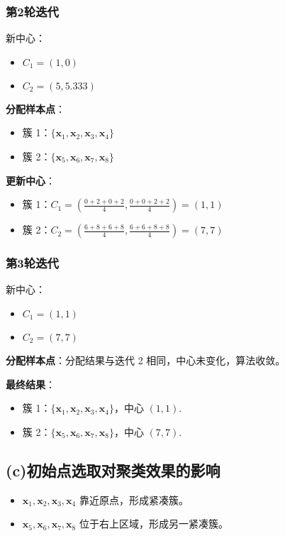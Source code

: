 \documentclass{article}
\begin{document}
\subsubsection*{第2轮迭代}
新中心：
\begin{itemize}
    \item \( C_1 = (1, 0) \)
    \item \( C_2 = (5, 5.333) \)
\end{itemize}
\textbf{分配样本点}：
\begin{itemize}
    \item 簇 1：\( \{ \mathbf{x}_1, \mathbf{x}_2, \mathbf{x}_3, \mathbf{x}_4 \} \)
    \item 簇 2：\( \{ \mathbf{x}_5, \mathbf{x}_6, \mathbf{x}_7, \mathbf{x}_8 \} \)
\end{itemize}
\textbf{更新中心}：
\begin{itemize}
    \item 簇 1：\( C_1 = \left( \frac{0+2+0+2}{4}, \frac{0+0+2+2}{4} \right) = (1, 1) \)
    \item 簇 2：\( C_2 = \left( \frac{6+8+6+8}{4}, \frac{6+6+8+8}{4} \right) = (7, 7) \)
\end{itemize}

\subsubsection*{第3轮迭代}
新中心：
\begin{itemize}
    \item \( C_1 = (1, 1) \)
    \item \( C_2 = (7, 7) \)
\end{itemize}
\textbf{分配样本点}：分配结果与迭代 2 相同，中心未变化，算法收敛。

\textbf{最终结果}：
\begin{itemize}
    \item 簇 1：\( \{ \mathbf{x}_1, \mathbf{x}_2, \mathbf{x}_3, \mathbf{x}_4 \} \)，中心 \( (1, 1) \).
    \item 簇 2：\( \{ \mathbf{x}_5, \mathbf{x}_6, \mathbf{x}_7, \mathbf{x}_8 \} \)，中心 \( (7, 7) \).
\end{itemize}

\subsection*{(c)初始点选取对聚类效果的影响}

\begin{itemize}
    \item \( \mathbf{x}_1, \mathbf{x}_2, \mathbf{x}_3, \mathbf{x}_4 \) 靠近原点，形成紧凑簇。
    \item \( \mathbf{x}_5, \mathbf{x}_6, \mathbf{x}_7, \mathbf{x}_8 \) 位于右上区域，形成另一紧凑簇。
\end{itemize}
\end{document}
